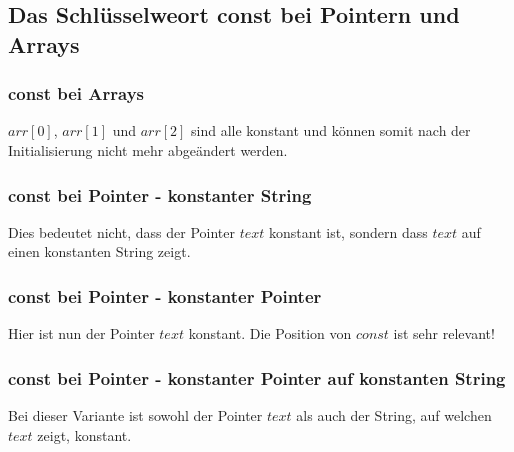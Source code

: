 	\subsection{Das Schlüsselweort const bei Pointern und Arrays }
		\begin{minipage}[t]{9 cm}
			\subsubsection{const bei Arrays}
				
				$arr[0]$, $arr[1]$ und $arr[2]$ sind alle konstant und können somit nach der Initialisierung nicht mehr abgeändert werden. \\
				
			\subsubsection{const bei Pointer - konstanter String}
				
				Dies bedeutet nicht, dass der Pointer $text$ konstant ist, sondern dass $text$ auf einen konstanten String zeigt.
		\end{minipage}
		\hspace*{0.5cm}
		\begin{minipage}[t]{9 cm}
			\subsubsection{const bei Pointer - konstanter Pointer}
				
				Hier ist nun der Pointer $text$ konstant. Die Position von $const$ ist sehr	relevant! \\
				
			\subsubsection{const bei Pointer - konstanter Pointer auf konstanten String}
				
				Bei dieser Variante ist sowohl der Pointer $text$ als auch der String, auf welchen $text$ zeigt, konstant. 
		\end{minipage}